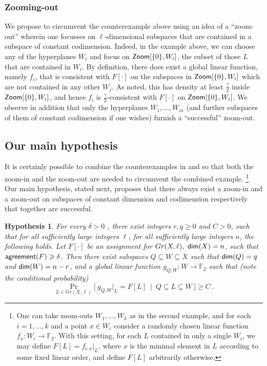 \documentclass{toc}
\newtheorem{conj}[theorem]{Hypothesis}
\newcommand\bProb[2]{{\Pr_{#1}\big[ {#2} \big]}}
\newcommand*\dimm{{\sf dim}}
\renewcommand\geq{\geqslant}
\renewcommand\ge{\geqslant}
\renewcommand\subset{\subseteq}
\newcommand{\Zoom}{{\sf Zoom}}
\def\F{\mathbb{F}}
\def\agr{{\sf agreement}}
\begin{document}
\subsubsection*{Zooming-out}

We propose to circumvent the counterexample above using an idea of a
``zoom-out'' wherein one focusses on $\ell$-dimensional subspaces that
are contained in a subspace of constant codimension. Indeed, in the
example above, we can choose any of the hyperplanes $W_i$ and focus on
${\Zoom}[\{0\}, W_i]$, the subset of those $L$ that are contained
in $W_i$. By definition, there does exist a global linear function,
namely $f_i$, that is consistent with $F[\cdot]$ on the subspaces in
${\Zoom}[\{0\}, W_i]$ which are not contained in any other
$W_j$. As noted, this has density at least $\frac{\gamma}{2}$ inside
${\Zoom}[\{0\}, W_i]$, and hence $f_i$ is
$\frac{\gamma}{2}$-consistent with $F[\cdot]$ on
${\Zoom}[\{0\}, W_i]$. We observe in addition that only the
hyperplanes $W_1, \ldots, W_m$ (and further subspaces of them of
constant codimension if one wishes) furnish a ``successful'' zoom-out.

\subsection{Our main hypothesis}

 It is certainly possible to combine the counterexamples
 in  and  so
 that both the zoom-in and the zoom-out are needed to circumvent the
 combined example. \footnote{One can take zoom-outs $W_1,\ldots,W_k$ as
 in the second example, and for each $i=1,\ldots,k$ and a point $x\in W_{i}$ consider
 a randomly chosen linear function $f_x\colon W_i\to\mathbb{F}_2$. With this setting,
 for each $L$ contained in only a single $W_i$, we may define $F[L] = f_{i,x}|_{L}$, where
 $x$ is the minimal element in $L$ according to some fixed linear order, and define $F[L]$ arbitrarily otherwise.}
 Our main hypothesis, stated next, proposes that
 there always exist a zoom-in and a zoom-out on subspaces of constant
 dimension and codimension respectively that together are successful.


\begin{conj}\label{conj:main}
  For every
  $\delta > 0$ , there exist integers
  $r,q \geq 0$ %
  and  %
  $C > 0$, such that for all sufficiently large integers $\ell$, for all sufficiently large integers $n$,  the following holds.
  Let $F[\cdot]$ be an assignment for $Gr(X,\ell), ~{\sf dim}(X) = n$, such that $\agr(F)\ge \delta$.
  Then there exist subspaces $Q\subset W \subset X$ such that $\dimm(Q)=q$ and $\dimm(W) = n-r$, and a
  global linear function $g_{Q,W}: W \to \F_2$ such that (note the conditional probability)
  \begin{equation} \label{eqn:global-fn}
  \bProb{L \in Gr(X, \ell)}{~g_{Q,W}|_L = F[L]  ~\mid  ~Q \subseteq L \subseteq W~}\geqslant C \,.
  \end{equation}
\end{conj}
\end{document}
